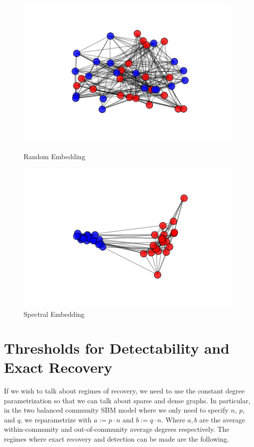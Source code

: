 \begin{figure}[h]
  \includegraphics[scale=0.6]{SBM_balanced_large_dense_rand.png}
  \caption{Random Embedding}
  \label{fig:randomproj}
\endminipage\hfill
{}
  \includegraphics[scale=0.6]{SBM_balanced_large_dense_spectral.png}
  \caption{Spectral Embedding}
  \label{fig:spectralproj}
\endminipage\hfill
\end{figure}

\section{Thresholds for Detectability and Exact Recovery}

If we wish to talk about regimes of recovery, we need to use the constant degree parametrization so that we can talk about sparse and dense graphs.  In particular, in the two balanced community SBM model where we only need to specify $n$, $p$, and $q$, we reparametrize with $a :=  p \cdot n$ and $b := q \cdot n$.  Where $a, b$ are the average within-community and out-of-community average degrees respectively.  The regimes where exact recovery and detection can be made are the following. 

